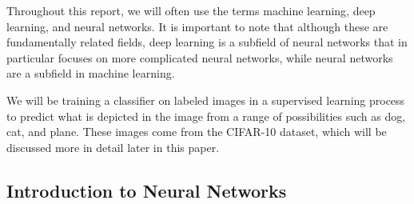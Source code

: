 \documentclass[12pt]{article}
\begin{document}
Throughout this report, we will often use the terms machine learning, deep learning, and neural networks. It is important to note that although these are fundamentally related fields, deep learning is a subfield of neural networks that in particular focuses on more complicated neural networks, while neural networks are a subfield in machine learning. 

We will be training a classifier on labeled images in a supervised learning process to predict what is depicted in the image from a range of possibilities such as dog, cat, and plane. These images come from the CIFAR-10 dataset, which will be discussed more in detail later in this paper.



	
\subsection{Introduction to Neural Networks}
\end{document}
